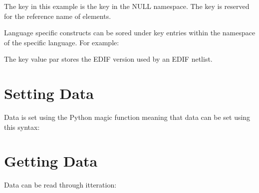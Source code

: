 \documentclass[letterpaper,10pt,english,openany,oneside]{sphinxmanual}
\begin{document}
\begin{sphinxVerbatim}[commandchars=\\\{\}]
\PYG{p}{[}\PYG{p}{]}  
\end{sphinxVerbatim}

The  key in this example is the key  in the NULL namespace. The key is reserved for the reference
name of elements.

Language specific constructs can be sored under key entries within the namespace of the specific language. For example:

\begin{sphinxVerbatim}[commandchars=\\\{\}]
\PYG{p}{[}\PYG{p}{]}    
\end{sphinxVerbatim}

The key value par stores the EDIF version used by an EDIF netlist.


\section{Setting Data}
\label{\detokenize{reference/element_data:setting-data}}
Data is set using the Python  magic function meaning that data can be set using this syntax:

\begin{sphinxVerbatim}[commandchars=\\\{\}]
\PYG{p}{[}\PYG{p}{]}  
\end{sphinxVerbatim}


\section{Getting Data}
\label{\detokenize{reference/element_data:getting-data}}
Data can be read through itteration:

\begin{sphinxVerbatim}[commandchars=\\\{\}]
   
     \PYG{p}{[}\PYG{p}{]}
\end{sphinxVerbatim}
\end{document}

